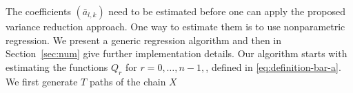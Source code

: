 \documentclass[bj]{imsart}
\def\NtrainPath{T}
\def\TrainSet{\mathcal{D}}
\newcommand*{\argmin}{\operatornamewithlimits{arg\,min}}
\begin{document}
\par
The coefficients \((\bar a_{l,k})\) need to be estimated before one can apply the proposed variance reduction approach.
One way to estimate them is to use nonparametric regression.
We present a generic regression algorithm and then in Section~\ref{sec:num} give further implementation details. Our algorithm starts with estimating the functions
$Q_r$ for $r=0,\ldots,n-1,$, defined in \eqref{eq:definition-bar-a}.
We first generate \(\NtrainPath\)  paths  of the chain \(X\)
\end{document}

